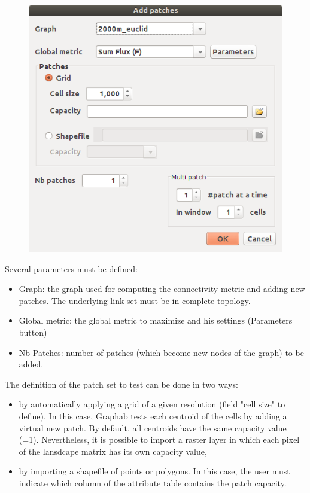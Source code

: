 \documentclass{article}
\begin{document}
\begin{figure}[H]
	\includegraphics[scale=0.5]{img/manual-en_addpatch.png} 
\end{figure}

Several parameters must be defined:
\begin{itemize}
	\item Graph: the graph used for computing the connectivity metric and adding new patches. The underlying link set must be in complete topology.
	\item Global metric: the global metric to maximize and his settings (Parameters button)
	\item Nb Patches: number of patches (which become new nodes of the graph) to be added.
\end{itemize}

The definition of the patch set to test can be done in two ways:
\begin{itemize}
	\item by automatically applying a grid of a given resolution (field "cell size" to define). In this case, Graphab tests each centroid of the cells by adding a virtual new patch. By default, all centroids have the same capacity value (=1). Nevertheless, it is possible to import a raster layer in which each pixel of the lansdcape matrix has its own capacity value,
	\item by importing a shapefile of points or polygons. In this case, the user must indicate which column of the attribute table contains the patch capacity.
\end{itemize}
\end{document}
